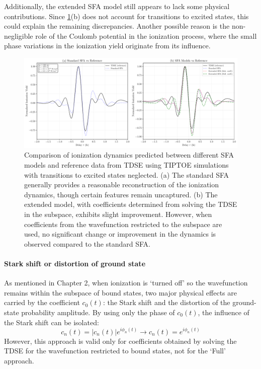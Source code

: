 \medskip
Additionally, the extended SFA model still appears to lack some physical contributions.
Since \ref{fig:tiptoe_sfa_comparison}(b) does not account for transitions to excited states, this could explain the remaining discrepancies.
Another possible reason is the non-negligible role of the Coulomb potential in the ionization process, where the small phase variations in the ionization yield originate from its influence.

\begin{figure}
    \centering
    \includegraphics[width=1\textwidth]{figures/2plot_SFA-comparison_1_BA.pdf}
    \caption[Comparison of ionization dynamics predicted by SFA models and TDSE]{Comparison of ionization dynamics predicted between different SFA models and reference data from TDSE using TIPTOE simulations with transitions to excited states neglected.  
            (a) The standard SFA generally provides a reasonable reconstruction of the ionization dynamics, though certain features remain uncaptured.  
            (b) The extended model, with coefficients determined from solving the TDSE in the subspace, exhibits slight improvement. However, when coefficients from the wavefunction restricted to the subspace are used, no significant change or improvement in the dynamics is observed compared to the standard SFA.}  
    \label{fig:tiptoe_sfa_comparison}
\end{figure}

\paragraph{Stark shift or distortion of ground state}
As mentioned in Chapter 2, when ionization is `turned off' so the wavefunction remains within the subspace of bound states, two major physical effects are carried by the coefficient $c_0(t)$: the Stark shift and the distortion of the ground-state probability amplitude. By using only the phase of $c_0(t)$, the influence of the Stark shift can be isolated: \begin{equation} c_n(t) = |c_n(t)|e^{i \phi_n(t)} \rightarrow c_n(t) = e^{i \phi_n(t)} \end{equation} However, this approach is valid only for coefficients obtained by solving the TDSE for the wavefunction restricted to bound states, not for the `Full' approach.

